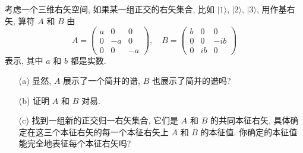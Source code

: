 \documentclass{assignment}
\begin{document}
\begin{prob}[课本习题 1.23]
    考虑一个三维右矢空间, 如果某一组正交的右矢集合, 比如 $\lvert 1\rangle$, $\lvert 2\rangle$, $\lvert 3\rangle$, 用作基右矢, 算符 $A$ 和 $B$ 由
    \[
        A=\begin{pmatrix}
            a&0&0\\
            0&-a&0\\
            0&0&-a
        \end{pmatrix},\quad B=\begin{pmatrix}
            b&0&0\\
            0&0&-ib\\
            0&ib&0
        \end{pmatrix}
    \]
    表示, 其中 $a$ 和 $b$ 都是实数.
    \begin{itemize}
        \item[(a)] 显然, $A$ 展示了一个简并的谱, $B$ 也展示了简并的谱吗?
        \item[(b)] 证明 $A$ 和 $B$ 对易.
        \item[(c)] 找到一组新的正交归一右矢集合, 它们是 $A$ 和 $B$ 的共同本征右矢, 具体确定在这三个本征右矢的每一个本征右矢上 $A$ 和 $B$ 的本征值. 你确定的本征值能完全地表征每个本征右矢吗?
    \end{itemize}
\end{prob}
\end{document}
